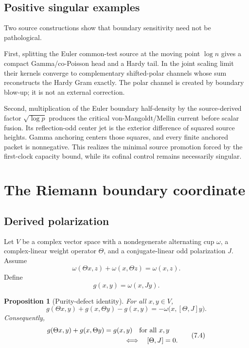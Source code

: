 \documentclass[11pt]{article}
\newtheorem{proposition}[theorem]{Proposition}
\theoremstyle{definition}
\theoremstyle{remark}
\begin{document}
\subsection{Positive singular examples}

Two source constructions show that boundary sensitivity need not be
pathological.

First, splitting the Euler common-test source at the moving point
\(\log n\) gives a compact Gamma/co-Poisson head and a Hardy tail.  In the
joint scaling limit their kernels converge to complementary shifted-polar
channels whose sum reconstructs the Hardy Gram exactly.  The polar channel
is created by boundary blow-up; it is not an external correction.

Second, multiplication of the Euler boundary half-density by the
source-derived factor \(\sqrt{\log p}\) produces the critical
von-Mangoldt/Mellin current before scalar fusion.  Its reflection-odd
center jet is the exterior difference of squared source heights.  Gamma
anchoring centers those squares, and every finite anchored packet is
nonnegative.  This realizes the minimal source promotion forced by the
first-clock capacity bound, while its cofinal control remains necessarily
singular.

\section{The Riemann boundary coordinate}
\label{sec:riemann-boundary}

\subsection{Derived polarization}

Let \(V\) be a complex vector space with a nondegenerate alternating cup
\(\omega\), a complex-linear weight operator \(\Theta\), and a
conjugate-linear odd polarization \(J\).  Assume
\[
 \omega(\Theta x,z)+\omega(x,\Theta z)=\omega(x,z).
\tag{7.1}\label{eq:cup-weight}
\]
Define
\[
                            g(x,y)=\omega(x,Jy).
\tag{7.2}\label{eq:derived-metric}
\]

\begin{proposition}[Purity-defect identity]
\label{prop:purity-defect}
For all \(x,y\in V\),
\[
 g(\Theta x,y)+g(x,\Theta y)-g(x,y)
    =-\omega\bigl(x,[\Theta,J]y\bigr).
\tag{7.3}\label{eq:purity-defect}
\]
Consequently,
\[
\begin{aligned}
 &g(\Theta x,y)+g(x,\Theta y)=g(x,y)
       \quad\text{for all }x,y\\
 &\hspace{40mm}\Longleftrightarrow\quad [\Theta,J]=0.
\end{aligned}
\tag{7.4}\label{eq:metric-commutator}
\]
\end{proposition}
\end{document}

